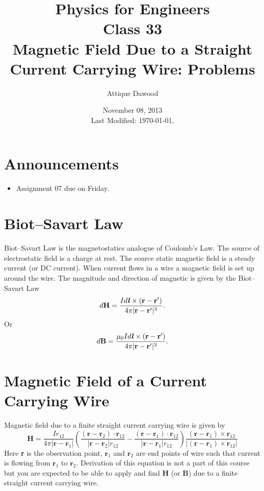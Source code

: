 \documentclass[12pt,a4paper]{article}
\title{\vspace{-3cm}Physics for Engineers\\Class 33\\Magnetic Field Due to a Straight Current Carrying Wire: Problems}
\author{Attique Dawood}
\date{November 08, 2013\\[0.2cm] Last Modified: \today, \currenttime}
\begin{document}
\maketitle
\section{Announcements}
\begin{itemize}
\item Assignment 07 due on Friday.
\end{itemize}
\section{Biot--Savart Law}
Biot--Savart Law is the magnetostatics analogue of Coulomb's Law. The source of electrostatic field is a charge at rest. The source static magnetic field is a steady current (or DC current). When current flows in a wire a magnetic field is set up around the wire. The magnitude and direction of magnetic is given by the Biot--Savart Law
\begin{equation}
d\textbf{H}=\dfrac{Id\textbf{\textit{l}}\times(\textbf{r}-\textbf{r}')}{4\pi|\textbf{r}-\textbf{r}'|^{3}}.
\end{equation}
Or
\begin{equation}
d\textbf{B}=\dfrac{\mu_0Id\textbf{\textit{l}}\times(\textbf{r}-\textbf{r}')}{4\pi|\textbf{r}-\textbf{r}'|^{3}}.
\end{equation}
\section{Magnetic Field of a Current Carrying Wire}
Magnetic field due to a finite straight current carrying wire is given by
\begin{equation}
\textbf{H}=\dfrac{Ir_{12}}{4\pi|\textbf{r}-\textbf{r}_1|}\left(\dfrac{(\textbf{r}-\textbf{r}_2)\cdot\textbf{r}_{12}}{|\textbf{r}-\textbf{r}_2|r_{12}}-\dfrac{(\textbf{r}-\textbf{r}_1)\cdot\textbf{r}_{12}}{|\textbf{r}-\textbf{r}_1|r_{12}}\right)\dfrac{(\textbf{r}-\textbf{r}_1)\times\textbf{r}_{12}}{|(\textbf{r}-\textbf{r}_1)\times \textbf{r}_{12}|}
\end{equation}
Here \textbf{r} is the observation point, $\textbf{r}_1$ and $\textbf{r}_2$ are end points of wire such that current is flowing from $\textbf{r}_1$ to $\textbf{r}_2$. Derivation of this equation is not a part of this course but you are expected to be able to apply and find \textbf{H} (or \textbf{B}) due to a finite straight current carrying wire.
\newpage
\end{document}
